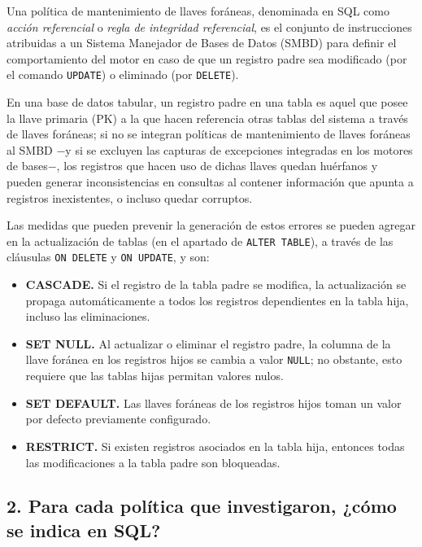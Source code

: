 \documentclass[12pt]{article}
\begin{document}
Una política de mantenimiento de llaves foráneas, denominada en SQL como \textit{acción referencial} o \textit{regla de integridad referencial}, es el conjunto de instrucciones atribuidas a un Sistema Manejador de Bases de Datos (SMBD) para definir el comportamiento del motor en caso de que un registro padre sea modificado (por el comando \texttt{UPDATE}) o eliminado (por \texttt{DELETE}).

En una base de datos tabular, un registro padre en una tabla es aquel que  posee la llave primaria (PK) a la que hacen referencia otras tablas del sistema a través de llaves foráneas; si no se integran políticas de mantenimiento de llaves foráneas al SMBD $-$y si se excluyen las capturas de excepciones integradas en los motores de bases$-$, los registros que hacen uso de dichas llaves quedan huérfanos y pueden generar inconsistencias en consultas al contener información que apunta a registros inexistentes, o incluso quedar corruptos.

Las medidas que pueden prevenir la generación de estos errores se pueden agregar en la actualización de tablas (en el apartado de \texttt{ALTER TABLE}), a través de las cláusulas \texttt{ON DELETE} y \texttt{ON UPDATE}, y son:
\begin{itemize}
    \item \textbf{CASCADE.} Si el registro de la tabla padre se modifica, la actualización se propaga automáticamente a todos los registros dependientes en la tabla hija, incluso las eliminaciones.
    \item \textbf{SET NULL.} Al actualizar o eliminar el registro padre, la columna de la llave foránea en los registros hijos se cambia a valor \texttt{NULL}; no obstante, esto requiere que las tablas hijas permitan valores nulos.
    \item \textbf{SET DEFAULT.} Las llaves foráneas de los registros hijos toman un valor por defecto previamente configurado.
    \item \textbf{RESTRICT.} Si existen registros asociados en la tabla hija, entonces todas las modificaciones a la tabla padre son bloqueadas.
\end{itemize}

\subsection*{2. Para cada política que investigaron, ¿cómo se indica en SQL?}
\end{document}
